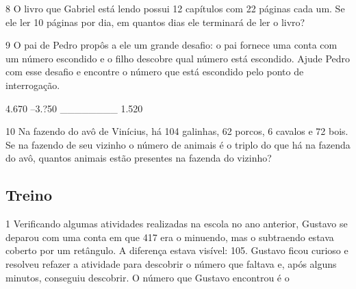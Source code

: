 \begin{mdframed}[linewidth=2pt,linecolor=salmao,roundcorner=2pt]

\end{mdframed}

\num{8} O livro que Gabriel está lendo possui 12 capítulos com 22 páginas cada
um. Se ele ler 10 páginas por dia, em quantos dias ele terminará de ler
o livro?

\begin{mdframed}[linewidth=2pt,linecolor=salmao,roundcorner=2pt]
\vspace{2cm}

\num{9} O pai de Pedro propôs a ele um grande desafio:
o pai fornece uma conta com um número escondido e o filho 
descobre qual número está escondido. Ajude Pedro com esse desafio e
encontre o número que está escondido pelo ponto de interrogação.

\begin{center}
    4.670
  --3.?50
  ________
    1.520
\end{center}


\num{10} Na fazendo do avô de Vinícius, há 104 galinhas, 62 porcos, 6 cavalos e 72
bois. Se na fazendo de seu vizinho o número de animais é o triplo do que
há na fazenda do avô, quantos animais estão presentes na fazenda do
vizinho?

\begin{mdframed}[linewidth=2pt,linecolor=salmao,roundcorner=2pt]

\vspace{1cm}
\end{mdframed}

\subsection{Treino}

\num{1} Verificando algumas atividades realizadas na escola no ano anterior,
Gustavo se deparou com uma conta em que 417 era o minuendo, mas o subtraendo
estava coberto por um retângulo. A diferença estava visível: 105.
Gustavo ficou curioso e resolveu refazer a atividade para descobrir o
número que faltava e, após alguns minutos, conseguiu descobrir. O número
que Gustavo encontrou é o


\end{mdframed}
